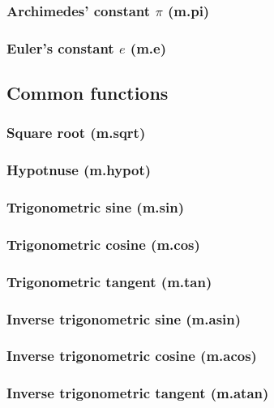 \documentclass{article}
\theoremstyle{definition}
\begin{document}
\subsubsection{Archimedes' constant $\pi$ (m.pi)}

\subsubsection{Euler's constant $e$ (m.e)}

\subsection{Common functions}

\subsubsection{Square root (m.sqrt)}

\subsubsection{Hypotnuse (m.hypot)}

\subsubsection{Trigonometric sine (m.sin)}

\subsubsection{Trigonometric cosine (m.cos)}

\subsubsection{Trigonometric tangent (m.tan)}

\subsubsection{Inverse trigonometric sine (m.asin)}

\subsubsection{Inverse trigonometric cosine (m.acos)}

\subsubsection{Inverse trigonometric tangent (m.atan)}
\end{document}
